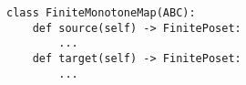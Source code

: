 \begin{verbatim}
class FiniteMonotoneMap(ABC):
    def source(self) -> FinitePoset:
        ...
    def target(self) -> FinitePoset:
        ...
\end{verbatim}